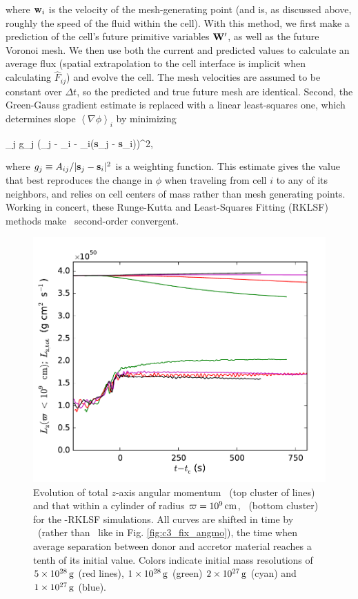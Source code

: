 \noindent where ${\bf w}_i$ is the velocity of the mesh-generating point (and is, as discussed above, roughly the speed of the fluid within the cell).  With this method, we first make a prediction of the cell's future primitive variables ${\bf W}^\prime$, as well as the future Voronoi mesh.  We then use both the current and predicted values to calculate an average flux (spatial extrapolation to the cell interface is implicit when calculating $\hat{F}_{ij}$) and evolve the cell.  The mesh velocities are assumed to be constant over $\Delta t$, so the predicted and true future mesh are identical.  Second, the Green-Gauss gradient estimate is replaced with a linear least-squares one, which determines slope $\left\langle \nabla \phi \right\rangle_i$ by minimizing

\eqbegin
\sum_j g_j \left(\phi_j - \phi_i - \left\langle \nabla \phi \right\rangle_i({\bf s}_j - {\bf s}_i)\right)^2,
\label{eq:c3_leastsq_grad}
\eqend

\noindent where $g_j \equiv A_{ij}/|{\bf s}_j - {\bf s}_i|^2$ is a weighting function.  This estimate gives the value that best reproduces the change in $\phi$ when traveling from cell $i$ to any of its neighbors, and relies on cell centers of mass rather than mesh generating points.  Working in concert, these Runge-Kutta and Least-Squares Fitting (RKLSF) methods make \arepo\ second-order convergent.

\begin{figure}
\centering
\includegraphics[angle=0,width=0.6\columnwidth]{chapter3_zhu+u/figures/lz_development2.pdf}
\caption{Evolution of total $z$-axis angular momentum \Lztot\ (top cluster of lines) and that within a cylinder of radius $\varpi = 10^9\,\mathrm{cm}$, \Lzinner\ (bottom cluster) for the \arepo-RKLSF simulations.  All curves are shifted in time by \tcoal\ (rather than \tlm\ like in Fig. \ref{fig:c3_fix_angmo}), the time when average separation between donor and accretor material reaches a tenth of its initial value.  Colors indicate initial mass resolutions of $5\times10^{28}\,\mathrm{g}$ (red lines), $1\times10^{28}\,\mathrm{g}$ (green) $2\times10^{27}\,\mathrm{g}$ (cyan) and $1\times10^{27}\,\mathrm{g}$ (blue).}
\label{fig:c3_fix_angmo_nar}
\end{figure}

